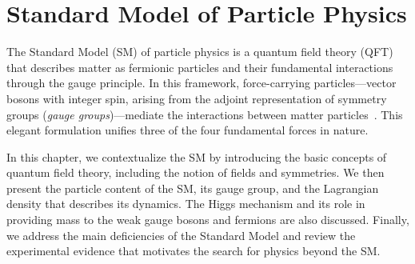 \chapter{Standard Model of Particle Physics}

The Standard Model (SM) of particle physics is a quantum field theory (QFT) that describes matter as fermionic particles and their fundamental interactions through the gauge principle. In this framework, force-carrying particles---vector bosons with integer spin, arising from the adjoint representation of symmetry groups (\textit{gauge groups})---mediate the interactions between matter particles~\parencite{greiner2000relativistic,pokorski2000gauge}. This elegant formulation unifies three of the four fundamental forces in nature.

In this chapter, we contextualize the SM by introducing the basic concepts of quantum field theory, including the notion of fields and symmetries. We then present the particle content of the SM, its gauge group, and the Lagrangian density that describes its dynamics. The Higgs mechanism and its role in providing mass to the weak gauge bosons and fermions are also discussed. Finally, we address the main deficiencies of the Standard Model and review the experimental evidence that motivates the search for physics beyond the SM.

